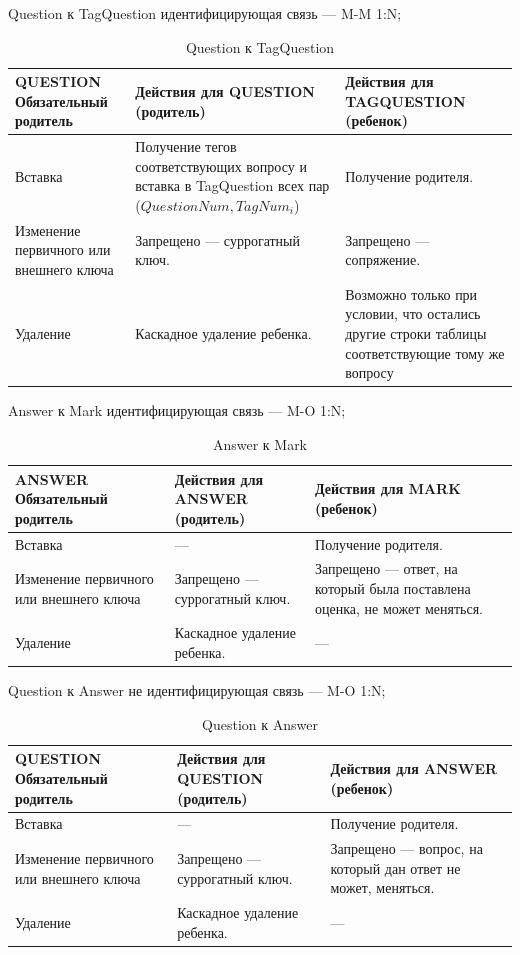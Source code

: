 \documentclass[a4paper, 14pt]{extarticle}
\begin{document}
\pagebreak

Question к TagQuestion идентифицирующая связь — M-M 1:N;

\begin{table}[H]
\centering
\caption{Question к TagQuestion}
\begin{tabular}{|>{\centering\arraybackslash}m{4cm}|>{\RaggedRight}m{6cm}|>{\RaggedRight}m{6cm}|}
\hline
\textbf{QUESTION Обязательный родитель} & \textbf{Действия для QUESTION (родитель)} & \textbf{Действия для TAGQUESTION (ребенок)} \\
\hline
Вставка & Получение тегов соответствующих вопросу и вставка в TagQuestion всех пар ($QuestionNum, TagNum_i$) & Получение родителя. \\
\hline
Изменение первичного или внешнего ключа & Запрещено — суррогатный ключ. & Запрещено — сопряжение. \\
\hline
Удаление & Каскадное удаление ребенка. & Возможно только при условии, что остались другие строки таблицы соответствующие тому же вопросу\\
\hline
\end{tabular}
\end{table}


Answer к Mark идентифицирующая связь — M-O 1:N;

\begin{table}[H]
\centering
\caption{Answer к Mark}
\begin{tabular}{|>{\centering\arraybackslash}m{4cm}|>{\RaggedRight}m{6cm}|>{\RaggedRight}m{6cm}|}
\hline
\textbf{ANSWER Обязательный родитель} & \textbf{Действия для ANSWER (родитель)} & \textbf{Действия для MARK (ребенок)} \\
\hline
Вставка & — & Получение родителя. \\
\hline
Изменение первичного или внешнего ключа & Запрещено — суррогатный ключ. & Запрещено — ответ, на который была поставлена оценка, не может меняться. \\
\hline
Удаление & Каскадное удаление ребенка. & — \\
\hline
\end{tabular}
\end{table}

\newpage

Question к Answer не идентифицирующая связь — M-O 1:N;

\begin{table}[H]
\centering
\caption{Question к Answer}
\begin{tabular}{|>{\centering\arraybackslash}m{4cm}|>{\RaggedRight}m{6cm}|>{\RaggedRight}m{6cm}|}
\hline
\textbf{QUESTION Обязательный родитель} & \textbf{Действия для QUESTION (родитель)} & \textbf{Действия для ANSWER (ребенок)} \\
\hline
Вставка & — & Получение родителя. \\
\hline
Изменение первичного или внешнего ключа & Запрещено — суррогатный ключ. & Запрещено — вопрос, на который дан ответ не может, меняться. \\
\hline
Удаление & Каскадное удаление ребенка. & — \\
\hline
\end{tabular}
\end{table}
\end{document}

